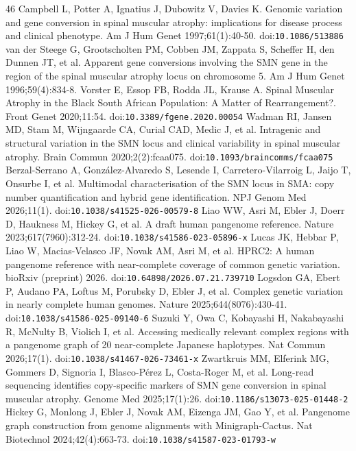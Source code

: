 \begin{thebibliography}{46}
 Campbell L, Potter A, Ignatius J, Dubowitz V, Davies K. Genomic variation and gene conversion in spinal muscular atrophy: implications for disease process and clinical phenotype. Am J Hum Genet 1997;61(1):40-50. doi:\nolinkurl{10.1086/513886}
 van der Steege G, Grootscholten PM, Cobben JM, Zappata S, Scheffer H, den Dunnen JT, et al. Apparent gene conversions involving the SMN gene in the region of the spinal muscular atrophy locus on chromosome 5. Am J Hum Genet 1996;59(4):834-8.
 Vorster E, Essop FB, Rodda JL, Krause A. Spinal Muscular Atrophy in the Black South African Population: A Matter of Rearrangement?. Front Genet 2020;11:54. doi:\nolinkurl{10.3389/fgene.2020.00054}
 Wadman RI, Jansen MD, Stam M, Wijngaarde CA, Curial CAD, Medic J, et al. Intragenic and structural variation in the SMN locus and clinical variability in spinal muscular atrophy. Brain Commun 2020;2(2):fcaa075. doi:\nolinkurl{10.1093/braincomms/fcaa075}
 Berzal-Serrano A, González-Alvaredo S, Lesende I, Carretero-Vilarroig L, Jaijo T, Onsurbe I, et al. Multimodal characterisation of the SMN locus in SMA: copy number quantification and hybrid gene identification. NPJ Genom Med 2026;11(1). doi:\nolinkurl{10.1038/s41525-026-00579-8}
 Liao WW, Asri M, Ebler J, Doerr D, Haukness M, Hickey G, et al. A draft human pangenome reference. Nature 2023;617(7960):312-24. doi:\nolinkurl{10.1038/s41586-023-05896-x}
 Lucas JK, Hebbar P, Liao W, Macias-Velasco JF, Novak AM, Asri M, et al. HPRC2: A human pangenome reference with near-complete coverage of common genetic variation. bioRxiv (preprint) 2026. doi:\nolinkurl{10.64898/2026.07.21.739710}
 Logsdon GA, Ebert P, Audano PA, Loftus M, Porubsky D, Ebler J, et al. Complex genetic variation in nearly complete human genomes. Nature 2025;644(8076):430-41. doi:\nolinkurl{10.1038/s41586-025-09140-6}
 Suzuki Y, Owa C, Kobayashi H, Nakabayashi R, McNulty B, Violich I, et al. Accessing medically relevant complex regions with a pangenome graph of 20 near-complete Japanese haplotypes. Nat Commun 2026;17(1). doi:\nolinkurl{10.1038/s41467-026-73461-x}
 Zwartkruis MM, Elferink MG, Gommers D, Signoria I, Blasco-Pérez L, Costa-Roger M, et al. Long-read sequencing identifies copy-specific markers of SMN gene conversion in spinal muscular atrophy. Genome Med 2025;17(1):26. doi:\nolinkurl{10.1186/s13073-025-01448-2}
 Hickey G, Monlong J, Ebler J, Novak AM, Eizenga JM, Gao Y, et al. Pangenome graph construction from genome alignments with Minigraph-Cactus. Nat Biotechnol 2024;42(4):663-73. doi:\nolinkurl{10.1038/s41587-023-01793-w}

\end{thebibliography}
